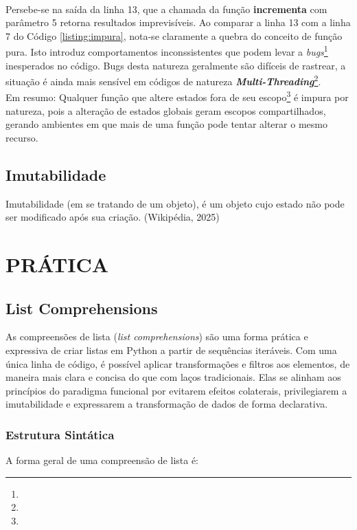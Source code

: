 \documentclass[date,twocolumn,a4paper]{ppgem}
\begin{document}
        \\Persebe-se na saída da linha 13, que a chamada da função \textbf{incrementa} com parâmetro 5 retorna resultados imprevisíveis. Ao comparar
        a linha 13 com a linha 7 do Código \ref{listing:impura}, nota-se claramente a quebra do conceito de função pura. Isto introduz comportamentos inconssistentes
        que podem levar a \textit{bugs}\footnote{} inesperados no código. Bugs desta natureza geralmente são difíceis de rastrear, a situação é ainda
        mais sensível em códigos de natureza \textit{\textbf{Multi-Threading}}\footnote{}.\\
        Em resumo: Qualquer função que altere estados fora de seu escopo\footnote{} é impura por natureza, pois a alteração de estados globais geram escopos compartilhados, gerando ambientes em que mais de uma função pode tentar alterar o mesmo recurso.

    \subsection{Imutabilidade}
        Imutabilidade (em se tratando de um objeto), é um objeto cujo estado não pode ser modificado após sua criação. (Wikipédia, 2025)\cite{wiki_immutable}
    
    
    \section{PRÁTICA}

    \subsection{List Comprehensions}
    As compreensões de lista (\textit{list comprehensions}) são uma forma prática e expressiva de criar listas em Python a partir de sequências iteráveis. Com uma única linha de código, é possível aplicar transformações e filtros aos elementos, de maneira mais clara e concisa do que com laços tradicionais. Elas se alinham aos princípios do paradigma funcional por evitarem efeitos colaterais, privilegiarem a imutabilidade e expressarem a transformação de dados de forma declarativa.

    \subsubsection{Estrutura Sintática}
    A forma geral de uma compreensão de lista é:
\end{document}
